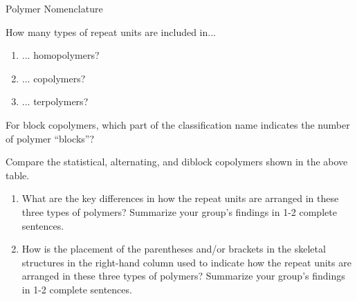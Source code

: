 \begin{activity}{Polymer Nomenclature}
\begin{ctqs}
	\question How many types of repeat units are included in...
	
		\begin{enumerate}
			\item ... homopolymers?
			
				\begin{solution}[0.25in]
				\end{solution}
			
			\item ... copolymers?
			
				\begin{solution}[0.25in]
				\end{solution}
			
			\item ... terpolymers?
			
				\begin{solution}[0.25in]
				\end{solution}
			
		\end{enumerate}
	
	\question For block copolymers, which part of the classification name indicates the number of polymer ``blocks''?
			
				\begin{solution}[0.5in]
				\end{solution}

	\question Compare the statistical, alternating, and diblock copolymers shown in the above table.
	
		\begin{enumerate}
		
			\item What are the key differences in how the repeat units are arranged in these three types of polymers?  Summarize your group's findings in 1-2 complete sentences.
			
				\begin{solution}[1.75in]
				\end{solution}
	
			\item How is the placement of the parentheses and/or brackets in the skeletal structures in the right-hand column used to indicate how the repeat units are arranged in these three types of polymers?  Summarize your group's findings in 1-2 complete sentences.
			
				\begin{solution}[1.75in]
				\end{solution}
			

\end{enumerate}
\end{ctqs}
\end{activity}
